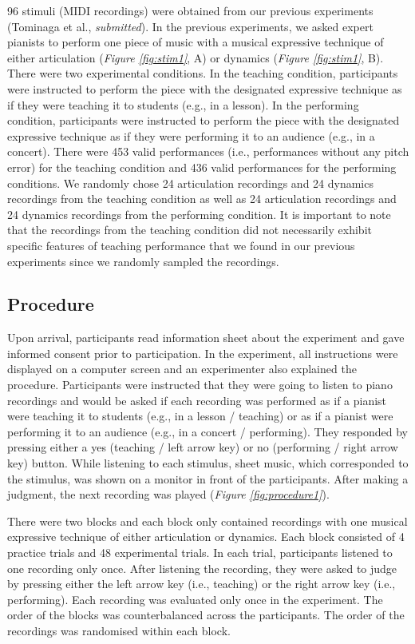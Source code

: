 \documentclass[
  man,floatsintext]{apa6}
\begin{document}
96 stimuli (MIDI recordings) were obtained from our previous experiments (Tominaga et al., \emph{submitted}). In the previous experiments, we asked expert pianists to perform one piece of music with a musical expressive technique of either articulation (\emph{Figure \ref{fig:stim1}}, A) or dynamics (\emph{Figure \ref{fig:stim1}}, B). There were two experimental conditions. In the teaching condition, participants were instructed to perform the piece with the designated expressive technique as if they were teaching it to students (e.g., in a lesson). In the performing condition, participants were instructed to perform the piece with the designated expressive technique as if they were performing it to an audience (e.g., in a concert). There were 453 valid performances (i.e., performances without any pitch error) for the teaching condition and 436 valid performances for the performing conditions. We randomly chose 24 articulation recordings and 24 dynamics recordings from the teaching condition as well as 24 articulation recordings and 24 dynamics recordings from the performing condition. It is important to note that the recordings from the teaching condition did not necessarily exhibit specific features of teaching performance that we found in our previous experiments since we randomly sampled the recordings.

\hypertarget{procedure}{%
\subsection{Procedure}\label{procedure}}

Upon arrival, participants read information sheet about the experiment and gave informed consent prior to participation. In the experiment, all instructions were displayed on a computer screen and an experimenter also explained the procedure. Participants were instructed that they were going to listen to piano recordings and would be asked if each recording was performed as if a pianist were teaching it to students (e.g., in a lesson / teaching) or as if a pianist were performing it to an audience (e.g., in a concert / performing). They responded by pressing either a yes (teaching / left arrow key) or no (performing / right arrow key) button. While listening to each stimulus, sheet music, which corresponded to the stimulus, was shown on a monitor in front of the participants. After making a judgment, the next recording was played (\emph{Figure \ref{fig:procedure1}}).

There were two blocks and each block only contained recordings with one musical expressive technique of either articulation or dynamics. Each block consisted of 4 practice trials and 48 experimental trials. In each trial, participants listened to one recording only once. After listening the recording, they were asked to judge by pressing either the left arrow key (i.e., teaching) or the right arrow key (i.e., performing). Each recording was evaluated only once in the experiment. The order of the blocks was counterbalanced across the participants. The order of the recordings was randomised within each block.
\end{document}
